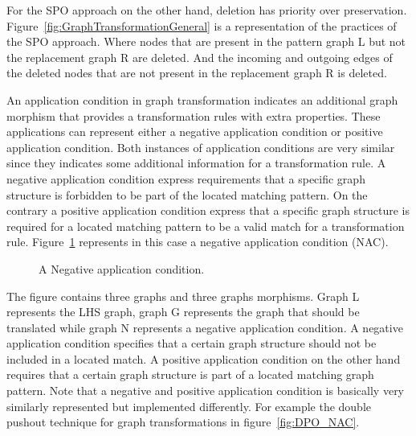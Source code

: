 For the SPO approach on the other hand, deletion has priority over preservation.
Figure~\ref{fig:GraphTransformationGeneral} is a representation of the practices
of the SPO approach. Where nodes that are present in the pattern graph L but not
the replacement graph R are deleted. And the incoming and outgoing edges of the
deleted nodes that are not present in the replacement graph R is deleted.

An application condition in graph transformation indicates an additional graph
morphism that provides a transformation rules with extra properties. These
applications can represent either a negative application condition or positive
application condition. Both instances of application conditions are very similar
since they indicates some additional information for a transformation rule. A
negative application condition express requirements that a specific graph
structure is forbidden to be part of the located matching pattern. On the
contrary a positive application condition express that a specific graph
structure is required for a located matching pattern to be a valid match for a
transformation rule. Figure~\ref{fig:NAC} represents in this case a negative
application condition\cite{habel1996graph} (NAC).

\begin{figure}[H]
	\centering
	\caption[A Negative application condition]
	{A Negative application condition.}
	\label{fig:NAC}
\end{figure}

The figure contains three graphs and three graphs morphisms. Graph L
represents the LHS graph, graph G represents the graph that should be
translated while graph N represents a negative application condition. A negative
application condition specifies that a certain graph structure should not be
included in a located match. A positive application condition on the other
hand requires that a certain graph structure is part of a located matching graph
pattern. Note that a negative and positive application condition is basically
very similarly represented but implemented differently. For example the double
pushout technique for graph transformations in figure~\ref{fig:DPO_NAC}. 


